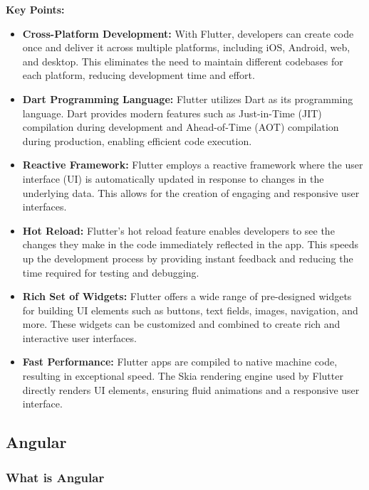 \documentclass[
12pt,
oneside, 
onehalfspacing, 
nolistspacing, 
parskip, 
chapterinoneline, 
]{AASTCOMPUTER}
\begin{document}
\textbf{Key Points:}

\begin{itemize}
\item \textbf{Cross-Platform Development:} With Flutter, developers can create code once and deliver it across multiple platforms, including iOS, Android, web, and desktop. This eliminates the need to maintain different codebases for each platform, reducing development time and effort.

\item \textbf{Dart Programming Language:} Flutter utilizes Dart as its programming language. Dart provides modern features such as Just-in-Time (JIT) compilation during development and Ahead-of-Time (AOT) compilation during production, enabling efficient code execution.

\item \textbf{Reactive Framework:} Flutter employs a reactive framework where the user interface (UI) is automatically updated in response to changes in the underlying data. This allows for the creation of engaging and responsive user interfaces.

\item \textbf{Hot Reload:} Flutter's hot reload feature enables developers to see the changes they make in the code immediately reflected in the app. This speeds up the development process by providing instant feedback and reducing the time required for testing and debugging.

\item \textbf{Rich Set of Widgets:} Flutter offers a wide range of pre-designed widgets for building UI elements such as buttons, text fields, images, navigation, and more. These widgets can be customized and combined to create rich and interactive user interfaces.

\item \textbf{Fast Performance:} Flutter apps are compiled to native machine code, resulting in exceptional speed. The Skia rendering engine used by Flutter directly renders UI elements, ensuring fluid animations and a responsive user interface.
\end{itemize}


\subsection{Angular}
\subsubsection{What is Angular}
\end{document}
